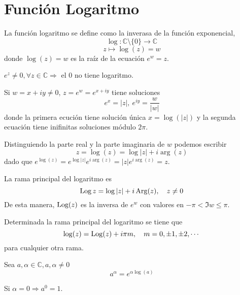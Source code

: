\section{Función Logaritmo}

\begin{defn}[Logaritmo]
  La función logaritmo se define como la inverasa de la función exponencial, 
  \[
    \log: \mathbb{C} \setminus \{ 0 \} \to \mathbb{C}
  \]
  \[
    z \mapsto \log(z) = w
  \]
  donde $\log(z) = w$ es la raíz de la ecuación $e^{w} = z$.
\end{defn}

\begin{obs}
  $e^{z} \neq 0, \forall z \in \mathbb{C} \Rightarrow$ el $0$ no tiene logaritmo.
\end{obs}

\begin{obs}
  Si $w = x + iy \neq 0$, $z = e^{w} = e^{x + iy}$ tiene soluciones 
  \[ 
  e^{x} = |z|, \ e^{iy} = \frac{w}{|w|} 
  \]
  donde la primera ecución tiene solución única $x = \log(|z|)$ y la segunda ecuación tiene inifinitas soluciones módulo $2\pi$.  
\end{obs}

\begin{obs}
  Distinguiendo la parte real y la parte imaginaria de $w$ podemos escribir 
  \[ 
  z = \log(z) = \log |z| + i\arg(z)
  \]
  dado que $e^{\log(z)} = e^{\log |z|} e^{i \arg(z)} = |z|e^{i \arg(z)} = z$.
\end{obs}

\begin{obs}
  La rama principal del logaritmo es
  \[ 
    \operatorname{Log} z = \log | z | + i \operatorname{Arg}(z), \quad z \neq 0
  \] 
  De esta manera, $\operatorname{Log}(z)$ es la inversa de $e^{w}$ con valores en $-\pi < \Im w \leq \pi$. 
\end{obs}

\begin{obs}
  Determinada la rama principal del logaritmo se tiene que
  \[ 
    \log(z) = \operatorname{Log}(z) + i \pi m, \quad m = 0, \pm 1, \pm 2, \cdots
  \] 
  para cualquier otra rama.
\end{obs}

\begin{defn}[Potencias]
  Sea $a,\alpha \in \mathbb{C}, a, \alpha \neq 0$
  \[ 
    a^{\alpha} = e^{\alpha \log(a)} 
  \] 
  
\end{defn}

\begin{obs}
  Si $\alpha = 0 \Rightarrow a^{0} = 1$.
\end{obs}

